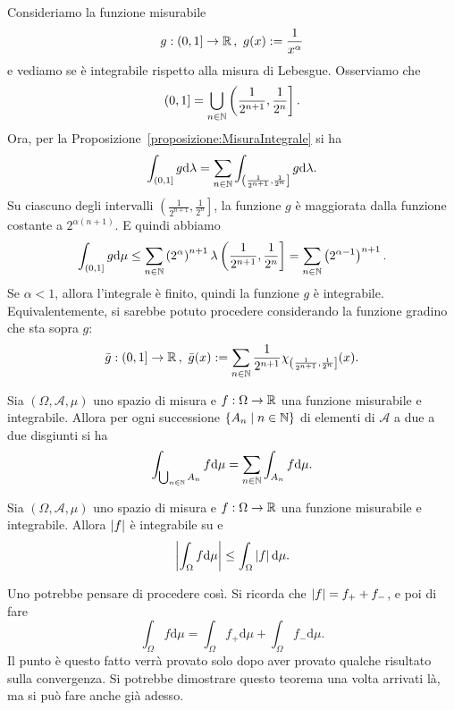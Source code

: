 \begin{esempio}
Consideriamo la funzione misurabile
\[g : (0, 1] \to \mathbb R\,,\ g(x) := \frac{1}{x^\alpha}\]
e vediamo se è integrabile rispetto alla misura di Lebesgue. Osserviamo che 
\[(0, 1] = \bigcup_{n \in \mathbb N} \left(\frac{1}{2^{n+1}}, \frac{1}{2^n}\right] .\] Ora, per la Proposizione~\ref{proposizione:MisuraIntegrale} si ha
\[\int_{(0, 1]} g \mathrm d \lambda = \sum_{n \in \mathbb N} \int_{\left(\frac{1}{2^{n+1}}, \frac{1}{2^n}\right]} g \mathrm d \lambda .\]
Su ciascuno degli intervalli \(\left(\frac{1}{2^{n+1}}, \frac{1}{2^n}\right]\), la funzione \(g\) è maggiorata dalla funzione costante a \(2^{\alpha(n+1)}\). E quindi abbiamo
\[\int_{(0, 1]} g \mathrm d \mu \le \sum_{n \in \mathbb N} \left(2^\alpha \right)^{n+1} \lambda \left(\frac{1}{2^{n+1}}, \frac{1}{2^n}\right] = \sum_{n \in \mathbb N} \left( 2^{\alpha-1} \right)^{n+1} .\]
Se \(\alpha < 1\), allora l'integrale è finito, quindi la funzione \(g\) è integrabile.\newline
Equivalentemente, si sarebbe potuto procedere considerando la funzione gradino che sta sopra \(g\):
\[\bar g : (0, 1] \to \mathbb R\,,\ \bar g(x) := \sum_{n \in \mathbb N} \frac{1}{2^{n+1}}\chi_{\left(\frac{1}{2^{n+1}}, \frac{1}{2^n}\right]} (x) .\]
\end{esempio}

\begin{corollario}
Sia \((\Omega, \mathcal A, \mu)\) uno spazio di misura e \(f : \Omega \to \mathbb R\) una funzione misurabile e integrabile. Allora per ogni successione \(\left\{A_n \mid n \in \mathbb N\right\}\) di elementi di \(\mathcal A\) a due a due disgiunti si ha
\[\int_{\bigcup_{n \in \mathbb N} A_n} f \mathrm d \mu = \sum_{n \in \mathbb N} \int_{A_n} f \mathrm d \mu .\]
\end{corollario}

\begin{proposizione}
Sia \((\Omega, \mathcal A, \mu)\) uno spazio di misura e \(f : \Omega \to \mathbb R\) una funzione misurabile e integrabile. Allora \(\left\lvert f\right\rvert\) è integrabile su e
\[\left\lvert\int_\Omega f \mathrm d \mu\right\rvert \le \int_\Omega \left\lvert f\right\rvert \mathrm d \mu .\]
\end{proposizione}

Uno potrebbe pensare di procedere così. Si ricorda che \(\left\lvert f\right\rvert = f_+ + f_-\), e poi di fare
\[\int_\Omega f \mathrm d \mu = \int_\Omega f_+ \mathrm d \mu + \int_\Omega f_- \mathrm d \mu .\]
Il punto è questo fatto verrà provato solo dopo aver provato qualche risultato sulla convergenza. Si potrebbe dimostrare questo teorema una volta arrivati là, ma si può fare anche già adesso.

